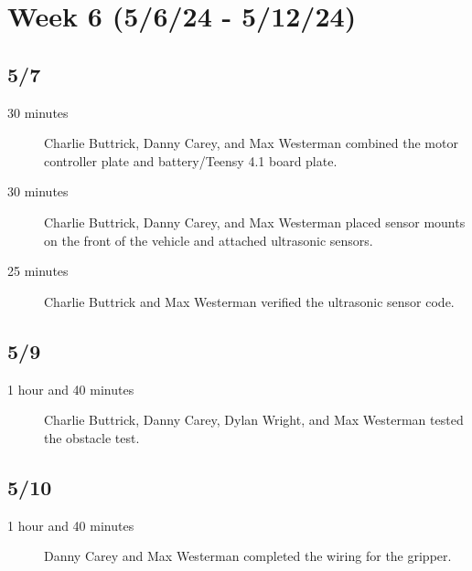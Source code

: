 \documentclass[11pt]{report}
\begin{document}
\section{Week 6 (5/6/24 - 5/12/24)}
\begin{adjustwidth}{0.5cm}{0cm}
\subsection*{5/7}
\begin{greylineformat}
\begin{description}
    \item [30 minutes] Charlie Buttrick, Danny Carey, and Max Westerman combined the motor controller plate and battery/Teensy 4.1 board plate. 
    \item [30 minutes] Charlie Buttrick, Danny Carey, and Max Westerman placed sensor mounts on the front of the vehicle and attached ultrasonic sensors. 
    \item [25 minutes] Charlie Buttrick and Max Westerman verified the ultrasonic sensor code. 
\end{description}\end{greylineformat}

\vspace{-2.1em}\subsection*{5/9}
\begin{greylineformat}
\begin{description}
    \item [1 hour and 40 minutes] Charlie Buttrick, Danny Carey, Dylan Wright, and Max Westerman tested the obstacle test. 
\end{description}\end{greylineformat}

\vspace{-2.1em}\subsection*{5/10}
\begin{greylineformat}
\begin{description}
    \item [1 hour and 40 minutes] Danny Carey and Max Westerman completed the wiring for the gripper. 
\end{description}\end{greylineformat}


\end{adjustwidth}
\end{document}
